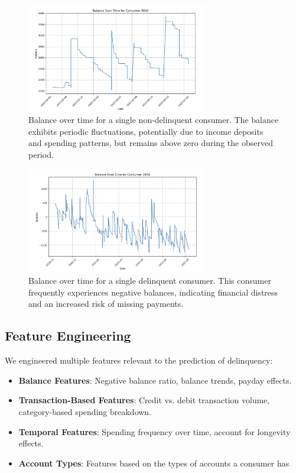 \documentclass[12pt,letterpaper]{article}
\begin{document}
\begin{figure}[H]
    \centering
    \includegraphics[width=0.7\textwidth]{figure/balance_single_non_delinquent.png}
    \caption{Balance over time for a single non-delinquent consumer. The balance exhibits periodic fluctuations, potentially due to income deposits and spending patterns, but remains above zero during the observed period.}
    \label{fig:balance_single_non_delinquent}
\end{figure}

\begin{figure}[H]
    \centering
    \includegraphics[width=0.7\textwidth]{figure/balance_single_delinquent.png}
    \caption{Balance over time for a single delinquent consumer. This consumer frequently experiences negative balances, indicating financial distress and an increased risk of missing payments.}
    \label{fig:balance_single_delinquent}
\end{figure}


\subsection{Feature Engineering}
We engineered multiple features relevant to the prediction of delinquency:
\begin{itemize}
    \item \textbf{Balance Features}: Negative balance ratio, balance trends, payday effects.
    \item \textbf{Transaction-Based Features}: Credit vs. debit transaction volume, category-based spending breakdown.
    \item \textbf{Temporal Features}: Spending frequency over time, account for longevity effects.
    \item \textbf{Account Types}: Features based on the types of accounts a consumer has
\end{itemize}
\end{document}
